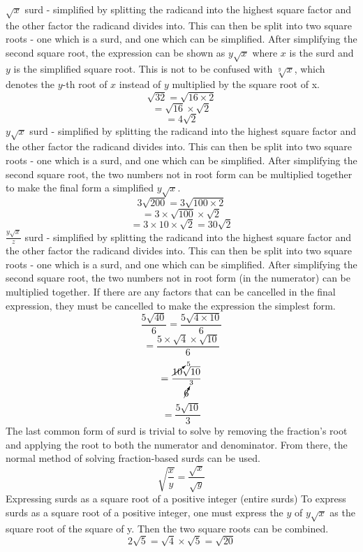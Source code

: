 \begin{outline}
			\3 $\sqrt{x}$ surd - simplified by splitting the radicand into the highest square factor and the other factor the radicand divides into. This can then be split into two square roots - one which is a surd, and one which can be simplified. After simplifying the second square root, the expression can be shown as $y\sqrt{x}$ where $x$ is the surd and $y$ is the simplified square root. This is not to be confused with $\sqrt[y]{x}$, which denotes the $y$-th root of $x$ instead of $y$ multiplied by the square root of {x}.
				\[\sqrt{32} = \sqrt{16 \times 2}\]
				\[= \sqrt{16} \times \sqrt{2}\]
				\[= 4\sqrt{2}\]
			\3 $y\sqrt{x}$ surd - simplified by splitting the radicand into the highest square factor and the other factor the radicand divides into. This can then be split into two square roots - one which is a surd, and one which can be simplified. After simplifying the second square root, the two numbers not in root form can be multiplied together to make the final form a simplified $y\sqrt{x}$.
				\[3\sqrt{200} = 3\sqrt{100 \times 2}\]
				\[= 3 \times \sqrt{100} \times \sqrt{2}\]
				\[= 3 \times 10 \times \sqrt{2} = 30\sqrt{2}\]
			\3 $\frac{y\sqrt{x}}{z}$ surd - simplified by splitting the radicand into the highest square factor and the other factor the radicand divides into. This can then be split into two square roots - one which is a surd, and one which can be simplified. After simplifying the second square root, the two numbers not in root form (in the numerator) can be multiplied together. If there are any factors that can be cancelled in the final expression, they must be cancelled to make the expression the simplest form.
				\[\frac{5\sqrt{40}}{6} = \frac{5\sqrt{4\times 10}}{6}\]
				\[= \frac{5 \times \sqrt{4} \times \sqrt{10}}{6}\]
				\[= \frac{\cancelto{5}{10} \sqrt{10}}{\cancelto{3}{6}}\]
				\[= \frac{5\sqrt{10}}{3}\]
			\3 The last common form of surd is trivial to solve by removing the fraction's root and applying the root to both the numerator and denominator. From there, the normal method of solving fraction-based surds can be used.
				\[\sqrt{\frac{x}{y}} = \frac{\sqrt{x}}{\sqrt{y}}\]
	\1 Expressing surds as a square root of a positive integer (entire surds)
		\2 To express surds as a square root of a positive integer, one must express the $y$ of $y\sqrt{x}$ as the square root of the square of y. Then the two square roots can be combined.
			\[2\sqrt{5} = \sqrt{4} \times \sqrt{5} = \sqrt{20}\]

\0

\end{outline}
